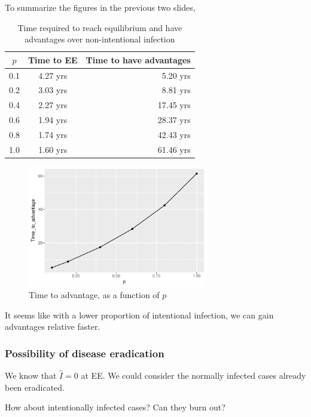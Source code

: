 \documentclass{beamer}
\begin{document}
\begin{frame}

To summarize the figures in the previous two slides,
\begin{table}[H]
\begin{center}
\caption{Time required to reach equilibrium and have advantages over non-intentional infection}
\label{tab:times}
\smallskip
\begin{tabular}{c|c|r}
{\bfseries $p$} & {\bfseries Time to EE} & {\bfseries Time to have advantages} \\\hline
0.1 & 4.27 yrs & 5.20 yrs \\
0.2 & 3.03 yrs & 8.81 yrs \\
0.4 & 2.27 yrs & 17.45 yrs \\
0.6 & 1.94 yrs & 28.37 yrs \\
0.8 & 1.74 yrs & 42.43 yrs \\
1.0 & 1.60 yrs & 61.46 yrs
\end{tabular}
\end{center}
\end{table}
\end{frame}
\begin{frame}
\begin{figure}[H]
  \centering
  \includegraphics[width=0.7\textwidth]{Figures/time_to_advantage_plot.pdf}
  \caption{Time to advantage, as a function of $p$}
\end{figure}
It seems like with a lower proportion of intentional infection, we can gain advantages relative faster.
\end{frame}
\begin{frame}
\frametitle{Possibility of disease eradication}

We know that $\hat{I}=0$ at EE. We could consider the normally infected cases already been eradicated.

\pause
How about intentionally infected cases? Can they burn out?
\end{frame}
\end{document}
